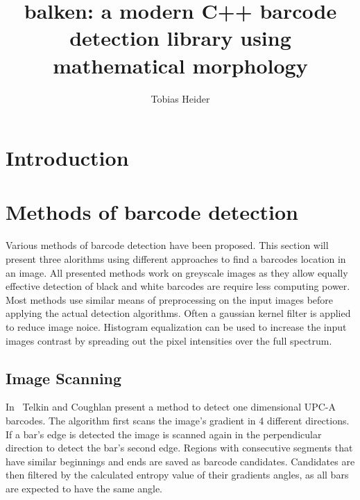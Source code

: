 \documentclass[runningheads,a4paper]{llncs}
\begin{document}
\mainmatter  %

\title{balken: a modern C++ barcode detection library using mathematical morphology}


%
\author{Tobias Heider}
%


\maketitle


\section{Introduction}

\section{Methods of barcode detection}
Various methods of barcode detection have been proposed. This section will
present three alorithms using different approaches to find a barcodes location
in an image.
All presented methods work on greyscale images as they allow
equally effective detection of black and white barcodes are require less
computing power. Most methods use similar means of preprocessing on the input images
before applying the actual detection algorithms. Often a gaussian kernel filter
is applied to reduce image noice. Histogram equalization can be used to increase
the input images contrast by spreading out the pixel intensities over the full spectrum.

\subsection{Image Scanning}

In~\cite{tekin2009algorithm} Telkin and Coughlan present a method to detect one
dimensional UPC-A barcodes.
The algorithm first scans the image's gradient in 4 different
directions. If a bar's edge is detected the image is scanned again in the
perpendicular direction to detect the bar's second edge. Regions with
consecutive segments that have similar beginnings and ends are saved as barcode
candidates. Candidates are then filtered by the calculated entropy value of
their gradients angles, as all bars are expected to have the same angle.
\end{document}
